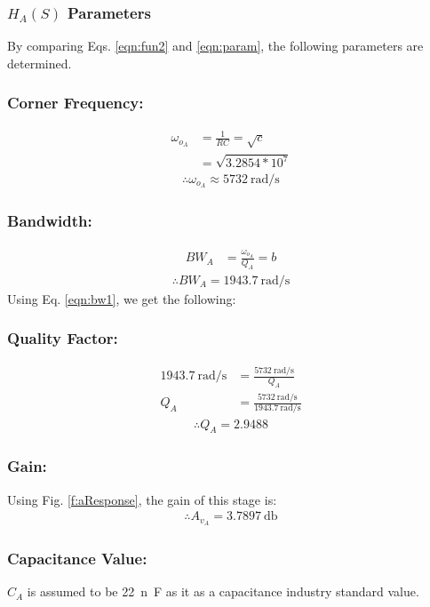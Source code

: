 \documentclass[hidelinks]{article}
\begin{document}
	\subsubsection{$H_A(S)$ Parameters}
	By comparing Eqs. \ref{eqn:fun2} and \ref{eqn:param}, the following parameters are determined.
	\subsubsection*{Corner Frequency:}
	\begin{align}
	\omega_{o_A} &= \frac{1}{RC} = \sqrt{c}\\
	&= \sqrt{3.2854 * 10 ^{7}} \nonumber
	\end{align}
	\begin{align*}
	\therefore \omega_{o_A} \approx \SI{5732}{\radian/\second}
	\end{align*}
	\subsubsection*{Bandwidth:}
	\begin{align}
	\label{eqn:bw1}
	BW_A &= \frac{\omega_{o_A}}{Q_A} = b
	\end{align}
	\begin{align*}
	\therefore BW_A = \SI{1943.7}{\radian/\second}
	\end{align*}
	Using Eq. \ref{eqn:bw1}, we get the following:
	\subsubsection*{Quality Factor:}
	\begin{align*}
	\SI{1943.7}{\radian/\second} &= \frac{\SI{5732}{\radian/\second}}{Q_A}\\
	Q_A &= \frac{\SI{5732}{\radian/\second}}{\SI{1943.7}{\radian/\second}}
	\end{align*}
	\begin{align*}
	\therefore Q_A = 2.9488
	\end{align*}
	\subsubsection*{Gain:}
	Using Fig. \ref{f:aResponse}, the gain of this stage is:
	\begin{align*}
	\therefore A_{v_A} = \SI{3.7897}{\decibel}
	\end{align*}
	\subsubsection*{Capacitance Value:}
	$C_A$ is assumed to be \SI{22}{n\farad} as it as a capacitance industry standard value.
\end{document}
